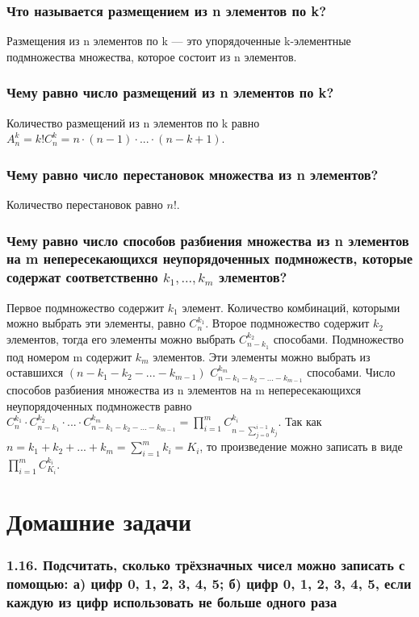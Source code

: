 \documentclass{book}
\begin{document}
\subsubsection*{Что называется размещением из n элементов по k?}
Размещения из n элементов по k --- это упорядоченные k-элементные подмножества множества, которое состоит из n элементов.

\subsubsection*{Чему равно число размещений из n элементов по k?}
Количество размещений из n элементов по k равно $A_n^k=k!C_n^k=n\cdot(n-1)\cdot...\cdot(n-k+1)$.

\subsubsection*{Чему равно число перестановок множества из n элементов?}
Количество перестановок равно $n!$.

\subsubsection*{Чему равно число способов разбиения множества из n элементов на m непересекающихся неупорядоченных подмножеств, которые содержат соответственно $k_1, ..., k_m$ элементов?}
Первое подмножество содержит $k_1$ элемент. Количество комбинаций, которыми можно выбрать эти элементы, равно $C_n^{k_1}$. Второе подмножество содержит $k_2$ элементов, тогда его элементы можно выбрать $C_{n-k_1}^{k_2}$ способами. Подмножество под номером m содержит $k_m$ элементов. Эти элементы можно выбрать из оставшихся $\left(n-k_1-k_2-...-k_{m-1}\right)$ $C_{n-k_1-k_2-...-k_{m-1}}^{k_m}$ способами. Число способов разбиения множества из n элементов на m непересекающихся неупорядоченных подмножеств равно $C_n^{k_1}\cdot C_{n-k_1}^{k_2}\cdot...\cdot C_{n-k_1-k_2-...-k_{m-1}}^{k_m}=\prod\limits_{i=1}^mC_{n-\sum\limits_{j=0}^{i-1}k_j}^{k_i}$. Так как $n=k_1+k_2+...+k_m=\sum\limits_{i=1}^m k_i=K_i$, то произведение можно записать в виде $\prod\limits_{i=1}^mC_{K_i}^{k_i}$.

\section*{Домашние задачи}

\subsubsection*{1.16. Подсчитать, сколько трёхзначных чисел можно записать с помощью: а) цифр 0, 1, 2, 3, 4, 5; б) цифр 0, 1, 2, 3, 4, 5, если каждую из цифр использовать не больше одного раза}
\end{document}
